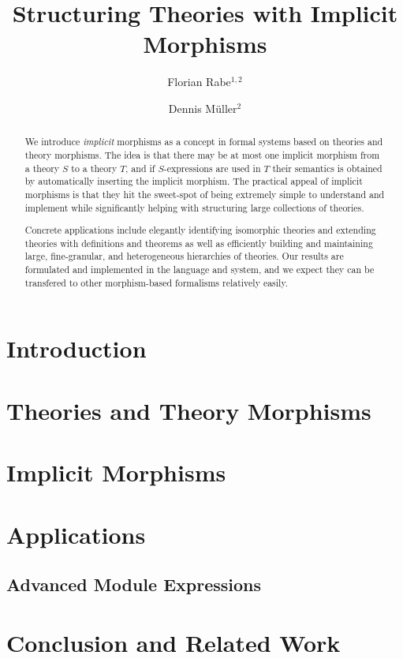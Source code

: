 \documentclass[orivec]{llncs}
\begin{document}
\title{Structuring Theories with Implicit Morphisms}
\author{Florian Rabe$^{1,2}$ \and Dennis M\"uller$^2$}
\maketitle

\begin{abstract}
We introduce \emph{implicit} morphisms as a concept in formal systems based on theories and theory morphisms.
The idea is that there may be at most one implicit morphism from a theory $S$ to a theory $T$, and if $S$-expressions are used in $T$ their semantics is obtained by automatically inserting the implicit morphism.
The practical appeal of implicit morphisms is that they hit the sweet-spot of being extremely simple to understand and implement while significantly helping with structuring large collections of theories.

Concrete applications include elegantly identifying isomorphic theories and extending theories with definitions and theorems as well as efficiently building and maintaining large, fine-granular, and heterogeneous hierarchies of theories.
Our results are formulated and implemented in the \mmt language and system, and we expect they can be transfered to other morphism-based formalisms relatively easily.
\end{abstract}


\section{Introduction}


\section{Theories and Theory Morphisms}\label{sec:mmt}


%

\section{Implicit Morphisms}\label{sec:impl}


\section{Applications}\label{sec:appl}


\begin{modexp}
\section{Advanced Module Expressions}\label{sec:complex}

\end{modexp}

\section{Conclusion and Related Work}\label{sec:conc}





\end{document}
